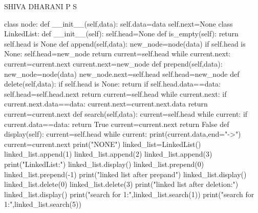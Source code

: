 
SHIVA DHARANI P S





class node:
    def __init__(self,data):
        self.data=data
        self.next=None
class LinkedList:
    def __init__(self):
        self.head=None
    def is_empty(self):
        return self.head is None
    def append(self,data):
        new_node=node(data)
        if self.head is None:
            self.head=new_node
            return
        current=self.head
        while current.next:
            current=current.next
        current.next=new_node
    def prepend(self,data):
        new_node=node(data)
        new_node.next=self.head
        self.head=new_node
    def delete(self,data):
        if self.head is None:
            return
        if self.head.data==data:
            self.head=self.head.next
            return
        current=self.head
        while current.next:
            if current.next.data==data:
                current.next=current.next.data
                return
            current=current.next
    def search(self,data):
        current=self.head
        while current:
            if current.data==data:
                return True
            current=current.next
        return False
    def display(self):
        current=self.head
        while current:
            print(current.data,end="->")
            current=current.next
        print("NONE")
linked_list=LinkedList()
linked_list.append(1)
linked_list.append(2)
linked_list.append(3)
print("LinkedList:")
linked_list.display()
linked_list.prepend(0)
linked_list.prepend(-1)
print("linked list after prepand")
linked_list.display()
linked_list.delete(0)
linked_list.delete(3)
print("linked list after deletion:")
linked_list.display()
print("search for 1:",linked_list.search(1))
print("search for 1:",linked_list.search(5))